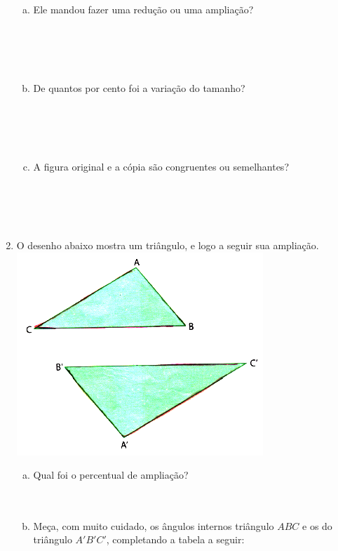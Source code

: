 \documentclass[a4paper,14pt]{article}
\begin{document}
\begin{multicols}{2}
\begin{enumerate}
			\newpage
			\begin{enumerate}[a)]
				\item Ele mandou fazer uma redução ou uma ampliação? \\\\\\\\\\
				\item De quantos por cento foi a variação do tamanho? \\\\\\\\\\
				\item A figura original e a cópia são congruentes ou semelhantes? \\\\\\\\\\
			\end{enumerate}
			\item O desenho abaixo mostra um triângulo, e logo a seguir sua ampliação. \\
			\includegraphics[width=1\linewidth]{6FMA143_imagens/imagem3}
			\begin{enumerate}[a)]
				\item Qual foi o percentual de ampliação? \\\\\\
				\item Meça, com muito cuidado, os ângulos internos triângulo $ABC$ e os do triângulo $A'B'C'$, completando a tabela a seguir:

\end{enumerate}
\end{enumerate}
\end{multicols}
\end{document}
